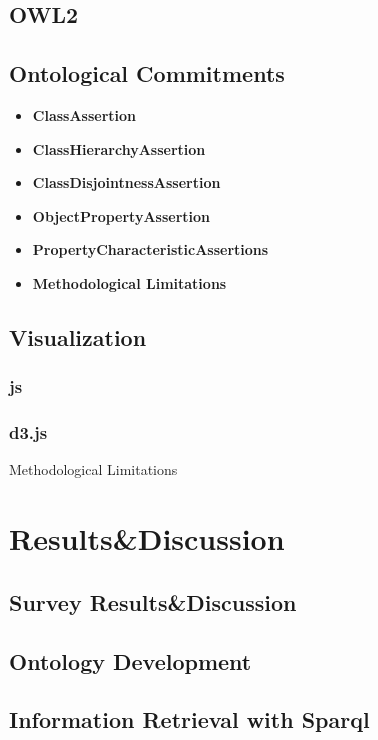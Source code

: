 \documentclass[runningheads]{llncs}
\begin{document}
\subsection{OWL2}

\subsection{Ontological Commitments}

\begin{itemize}
    \item \textbf{ClassAssertion }
    \item \textbf{ClassHierarchyAssertion}
    \item \textbf{ClassDisjointnessAssertion}
    \item \textbf{ObjectPropertyAssertion}
    \item \textbf{PropertyCharacteristicAssertions}
    \item \textbf{Methodological Limitations}
\end{itemize}

\subsection*{Visualization}

\subsubsection{js}

\subsubsection{d3.js}

Methodological Limitations


\section{Results\&Discussion}

\subsection{Survey Results\&Discussion}
\subsection{Ontology Development}
\subsection{Information Retrieval with Sparql}
\end{document}
